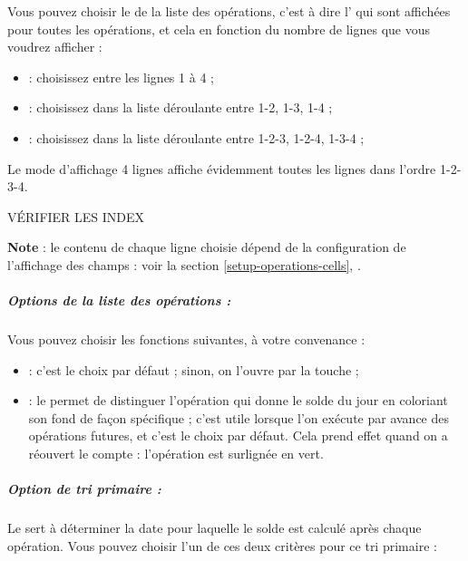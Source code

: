 Vous pouvez choisir le  de la liste des opérations, c'est à dire l' qui sont affichées pour toutes les opérations, et cela en fonction du nombre de lignes que vous voudrez afficher : 
\begin{itemize}
	\item {} : choisissez entre les lignes 1 à 4 ;
	\item {} : choisissez dans la liste déroulante entre 1-2, 1-3, 1-4 ;
	\item {} : choisissez dans la liste déroulante entre 1-2-3, 1-2-4, 1-3-4 ;
\end{itemize}

Le mode d'affichage 4 lignes affiche évidemment toutes les lignes dans l'ordre 1-2-3-4.

VÉRIFIER LES INDEX

\textbf{Note} : le contenu de chaque ligne choisie dépend de la configuration de l'affichage des champs : voir la section \vref{setup-operations-cells}, .



\subparagraph{Options de la liste des opérations :}

Vous pouvez choisir les fonctions suivantes, à votre convenance :
\begin{itemize}
	\item {} : c'est le choix par défaut ; sinon, on l'ouvre par la touche  ;
	\item {} : le  permet de distinguer l'opération qui donne le solde du jour en coloriant son fond de façon spécifique ; c'est utile lorsque l'on exécute par avance des opérations futures, et c'est le choix par défaut. Cela prend effet quand on a réouvert le compte : l'opération est surlignée en vert{\couleur}.
\end{itemize}


\subparagraph{Option de tri primaire :}

Le  sert à déterminer la date pour laquelle le  solde est calculé après chaque opération. Vous pouvez choisir l'un de ces deux critères pour ce tri primaire :

